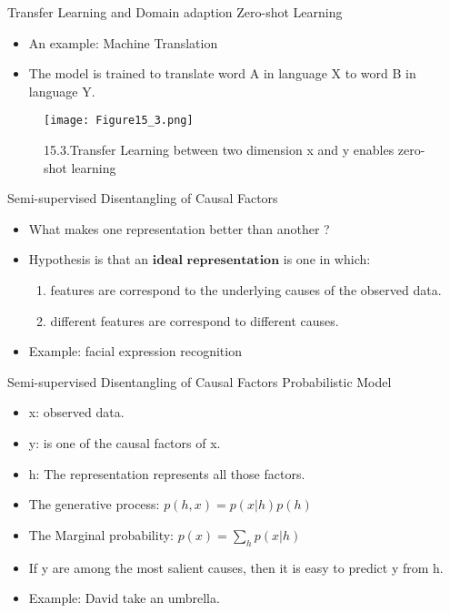 \begin{frame}{Transfer Learning and Domain adaption}
Zero-shot Learning
\begin{itemize}
   \item An example: Machine Translation
   \item The model is trained to translate word A in language X to word B in language Y.
\end{itemize}
\begin{figure}[t]
\centering
\texttt{[image: Figure15\_3.png]} %
\caption{15.3.Transfer Learning between two dimension x and y enables zero-shot learning}
\end{figure}
\end{frame}

\begin{frame}{Semi-supervised Disentangling of Causal Factors}
\begin{itemize}
  \item What makes one representation better than another ?
  \item Hypothesis is that an $\bm{ideal}$ $\bm{representation}$ is one in which:
   \begin{enumerate} %
   \item features are correspond to the underlying causes of the observed data.
   \item different features are correspond to different causes.
   \end{enumerate}
  \item Example: facial expression recognition
\end{itemize}
\end{frame}

\begin{frame}{Semi-supervised Disentangling of Causal Factors}
Probabilistic Model
\begin{itemize}
  \item x: observed data.
  \item y: is one of the causal factors of x.
  \item h: The representation represents all those factors.
  \item The generative process: $ p(h,x) = p(x|h)p(h) $
  \item The Marginal probability: $ p(x) = \sum\limits_{h} p(x|h) $
  \item If y are among the most salient causes, then it is easy to predict y from h.
  \item Example: David take an umbrella.
\end{itemize}
\end{frame}

